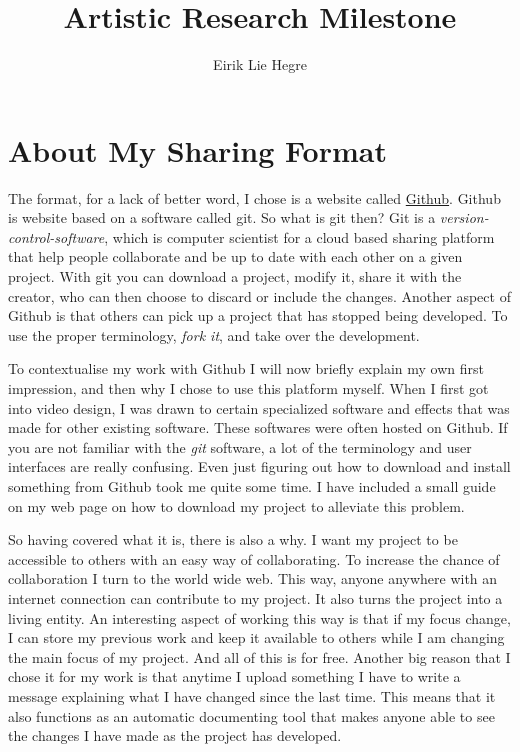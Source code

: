 \documentclass[12pt, letterpaper]{article}
\title{Artistic Research Milestone}
\author{Eirik Lie Hegre}
\begin{document}
\maketitle

\section{About My Sharing Format}
The format, for a lack of better word, I chose is a website called
\href{https://github.com}{Github}. Github is website based on a software
called git. So what is git then? Git is a \textit{version-control-software},
which is computer scientist for a cloud based sharing platform that help people
collaborate and be up to date with each other on a given project. With
git you can download a project, modify it, share it with the creator, who can
then choose to discard or include the changes. Another aspect of Github is that
others can pick up a project that has stopped being developed. To use the proper
terminology, \textit{fork it}, and take over the development.
\par
To contextualise my work with Github I will now briefly explain my own first
impression, and then why I chose to use this platform myself. When I first got
into video design, I was drawn to certain specialized software and effects
that was made for other existing software. These softwares were often hosted on
Github. If you are not familiar with the \textit{git} software,
 a lot of the terminology and
user interfaces are really confusing. Even just figuring out how to download
and install something from Github took me quite some time. I have included a
small guide on my web page on how to download my project to alleviate this
problem.
\par
So having covered what it is, there is also a why. I want my project to be
accessible to others with an easy way of collaborating. To increase the chance of
collaboration I turn to the world wide web. This way, anyone anywhere with an
internet connection can contribute to my project. It also turns the project into
a living entity. An interesting aspect of working this way is that if my
focus change, I can store my previous work and keep it available to others
while I am changing the main focus of my project. And all of this is for free.
Another big reason that I chose it for my work is that anytime I upload
something I have to write a message explaining what I have changed since the
last time. This means that it also functions as an automatic documenting tool
that makes anyone able to see the changes I have made as the project has
developed.
\end{document}
